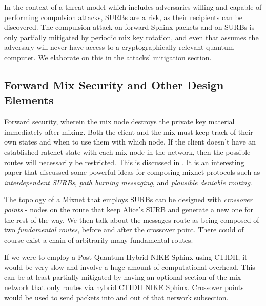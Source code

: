 \documentclass{article}
\begin{document}
In the context of a threat model which includes adversaries willing and capable of performing compulsion attacks, SURBs are a risk, as their recipients can be discovered. The compulsion attack on forward Sphinx packets and on SURBs is only partially mitigated by periodic mix key rotation, and even that assumes the adversary will never have access to a cryptographically relevant quantum computer. We elaborate on this in the attacks' mitigation section.

\subsection{Forward Mix Security and Other Design Elements}

Forward security, wherein the mix node destroys the private key material immediately after mixing. Both the client and the mix must keep track of their own states and when to use them with which node. If the client doesn't have an established ratchet state with each mix node in the network, then the possible routes will necessarily be restricted. This is discussed in . It is an interesting paper that discussed some powerful ideas for composing mixnet protocols such as \textit{interdependent SURBs}, \textit{path burning messaging}, and \textit{plausible deniable routing}. 

The topology of a Mixnet that employs SURBs can be designed with \textit{crossover points} - nodes on the route that keep Alice's SURB and generate a new one for the rest of the way. We then talk about the messages route as being composed of two \textit{fundamental routes}, before and after the crossover point. There could of course exist a chain of arbitrarily many fundamental routes.

If we were to employ a Post Quantum Hybrid NIKE Sphinx using CTIDH, it would be very slow and involve a huge amount of computational overhead. This can be at least partially mitigated by having an optional section of the mix network that only routes via hybrid CTIDH NIKE Sphinx. Crossover points would be used to send packets into and out of that network subsection.
\end{document}
